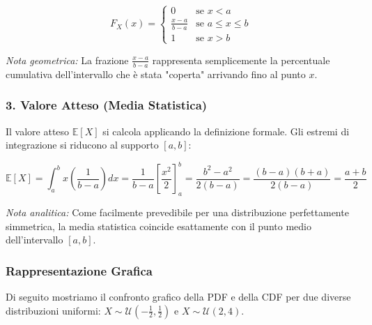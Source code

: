 \begin{equation}
F_X(x) = 
\begin{cases} 
0 & \text{se } x < a \\ 
\frac{x-a}{b-a} & \text{se } a \le x \le b \\ 
1 & \text{se } x > b 
\end{cases}
\end{equation}

\textit{Nota geometrica:} La frazione $\frac{x-a}{b-a}$ rappresenta semplicemente la percentuale cumulativa dell'intervallo che è stata "coperta" arrivando fino al punto $x$.

\subsubsection{3. Valore Atteso (Media Statistica)}
Il valore atteso $\mathbb{E}[X]$ si calcola applicando la definizione formale. Gli estremi di integrazione si riducono al supporto $[a, b]$:

\begin{equation}
\mathbb{E}[X] = \int_{a}^{b} x \left( \frac{1}{b-a} \right) dx = \frac{1}{b-a} \left[ \frac{x^2}{2} \right]_{a}^{b} = \frac{b^2 - a^2}{2(b-a)} = \frac{(b-a)(b+a)}{2(b-a)} = \frac{a+b}{2}
\end{equation}

\textit{Nota analitica:} Come facilmente prevedibile per una distribuzione perfettamente simmetrica, la media statistica coincide esattamente con il punto medio dell'intervallo $[a, b]$.

\subsubsection{Rappresentazione Grafica}
Di seguito mostriamo il confronto grafico della PDF e della CDF per due diverse distribuzioni uniformi: $X \sim \mathcal{U}\left(-\frac{1}{2}, \frac{1}{2}\right)$ e $X \sim \mathcal{U}(2, 4)$.

